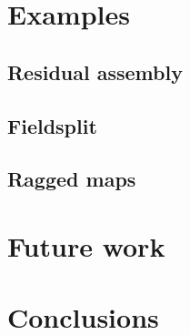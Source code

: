 
  \section{Examples}

  \subsection{Residual assembly}

  \subsection{Fieldsplit}

  \subsection{Ragged maps}



  \section{Future work}


  \section{Conclusions}
